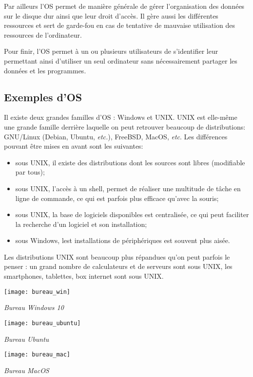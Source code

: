Par ailleurs l'OS permet de manière générale de gérer l'organisation des données sur le disque dur ainsi que leur droit d'accès. Il gère aussi les différentes ressources et sert de garde-fou en cas de tentative de mauvaise utilisation des ressources de l'ordinateur.

Pour finir, l'OS permet à un ou plusieurs utilisateurs de s'identifier leur permettant ainsi d'utiliser un seul ordinateur sans nécessairement partager les données et les programmes. 



\subsection{Exemples d'OS}
Il existe deux grandes familles d'OS : Windows et UNIX. UNIX est elle-même une grande famille derrière laquelle on peut retrouver beaucoup de distributions:  GNU/Linux (Debian, Ubuntu, \textit{etc.}), FreeBSD, MacOS, \textit{etc}. Les différences pouvant être mises en avant sont les suivantes:
\begin{itemize}
\item sous UNIX, il existe des distributions dont les sources sont libres (modifiable par tous);
\item sous UNIX, l'accès à un shell, permet de réaliser une multitude de tâche en ligne de commande, ce qui est parfois plus efficace qu'avec la souris;
\item sous UNIX, la base de logiciels disponibles est centralisée, ce qui peut faciliter la recherche d'un logiciel et son installation;
\item sous Windows, lest installations de périphériques est souvent plus aisée. 
\end{itemize}

Les distributions UNIX sont beaucoup plus répandues qu'on peut parfois le penser : un grand nombre de calculateurs et de serveurs sont sous UNIX, les smartphones, tablettes, box internet sont sous UNIX.



\begin{minipage}[c]{.3\linewidth}
\begin{center}
\texttt{[image: bureau\_win]}

\textit{Bureau Windows 10}
\end{center}
\end{minipage} \hfill
\begin{minipage}[c]{.3\linewidth}
\begin{center}
\texttt{[image: bureau\_ubuntu]}

\textit{Bureau Ubuntu}
\end{center}
\end{minipage} \hfill
\begin{minipage}[c]{.3\linewidth}
\begin{center}
\texttt{[image: bureau\_mac]}

\textit{Bureau MacOS}
\end{center}
\end{minipage} 

